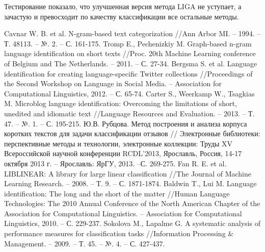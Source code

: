 \documentclass[a4paper, 14pt]{article}
\begin{document}
		Тестирование показало, что улучшенная версия метода LIGA не уступает, а зачастую и превосходит по качеству классификации все остальные методы.
		
		

  \begin{thebibliography}{99}
     Cavnar W. B. et al. N-gram-based text categorization //Ann Arbor MI. – 1994. – Т. 48113. – №. 2. – С. 161-175.
     Tromp E., Pechenizkiy M. Graph-based n-gram language identification on short texts //Proc. 20th Machine Learning conference of Belgium and The Netherlands. – 2011. – С. 27-34.
     Bergsma S. et al. Language identification for creating language-specific Twitter collections //Proceedings of the Second Workshop on Language in Social Media. – Association for Computational Linguistics, 2012. – С. 65-74.
     Carter S., Weerkamp W., Tsagkias M. Microblog language identification: Overcoming the limitations of short, unedited and idiomatic text //Language Resources and Evaluation. – 2013. – Т. 47. – №. 1. – С. 195-215.
     Ю.В. Рубцова. Метод построения и анализа корпуса коротких текстов для задачи классификации отзывов // Электронные библиотеки: перспективные методы и технологии, электронные коллекции: Труды XV Всероссийской научной конференции RCDL’2013, Ярославль, Россия, 14-17 октября 2013 г. – Ярославль: ЯрГУ, 2013. –С. 269-275.
     Fan R. E. et al. LIBLINEAR: A library for large linear classification //The Journal of Machine Learning Research. – 2008. – Т. 9. – С. 1871-1874.
     Baldwin T., Lui M. Language identification: The long and the short of the matter //Human Language Technologies: The 2010 Annual Conference of the North American Chapter of the Association for Computational Linguistics. – Association for Computational Linguistics, 2010. – С. 229-237.
     Sokolova M., Lapalme G. A systematic analysis of performance measures for classification tasks //Information Processing \& Management. – 2009. – Т. 45. – №. 4. – С. 427-437.
  \end{thebibliography}
\end{document}
